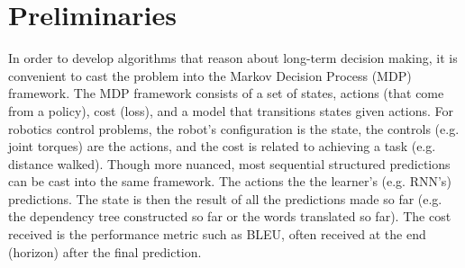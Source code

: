 \documentclass{article}
\newcommand{\BB}[1]{\textcolor{red}{\bf Byron: {#1}}}
\newcommand{\drew}[1]{\textcolor{blue}{\bf Drew: {#1}}}
\begin{document}

\section{Preliminaries}
In order to develop algorithms that reason about long-term decision making, it is convenient to cast the problem into the Markov Decision Process (MDP) framework. The MDP framework consists of a set of states, actions (that come from a policy), cost (loss), and a model that transitions states given actions. For robotics control problems, the robot's configuration is the state, the controls (e.g. joint torques) are the actions, and the cost is related to achieving a task (e.g. distance walked). Though more nuanced, most sequential structured predictions can be cast into the same framework. The actions the the learner's (e.g. RNN's) predictions. The state is then the result of all the predictions made so far (e.g. the dependency tree constructed so far or the words translated so far). The cost received is the performance metric such as BLEU, often received at the end (horizon) after the final prediction.
\end{document}
